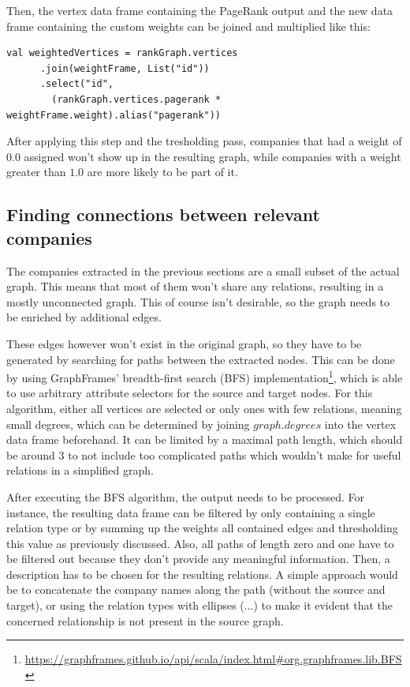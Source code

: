 \documentclass[
        a4paper,     %
        titlepage,   %
        oneside,     %
        parskip      %
        ]{scrartcl}  %
\begin{document}
  Then, the vertex data frame containing the PageRank output and the new
  data frame containing the custom weights can be joined and multiplied like this:

  \begin{lstlisting}[style=scalaStyle,caption=Custom Weight Joining]
    val weightedVertices = rankGraph.vertices
      .join(weightFrame, List("id"))
      .select("id",
        (rankGraph.vertices.pagerank * weightFrame.weight).alias("pagerank"))
  \end{lstlisting}

  After applying this step and the tresholding pass, companies that had a weight of $0.0$ assigned won't
  show up in the resulting graph, while companies with a weight greater than $1.0$
  are more likely to be part of it.

  \subsection{Finding connections between relevant companies}
  The companies extracted in the previous sections are a small subset of the actual
  graph. This means that most of them won't share any relations, resulting in a
  mostly unconnected graph. This of course isn't desirable, so the graph needs to
  be enriched by additional edges.

  These edges however won't exist in the original graph, so they have to be generated
  by searching for paths between the extracted nodes. This can be done by using
  GraphFrames' breadth-first search (BFS)
  implementation\footnote{\url{https://graphframes.github.io/api/scala/index.html\#org.graphframes.lib.BFS}},
  which is able to use arbitrary attribute selectors for the source and target nodes.
  For this algorithm, either all vertices are selected or only ones with few relations,
  meaning small degrees, which can be determined by joining $graph.degrees$ into the vertex data frame beforehand.
  It can be limited by a maximal path length, which should be around 3 to not
  include too complicated paths which wouldn't make for useful relations in a simplified graph.

  After executing the BFS algorithm, the output needs to be processed. For instance,
  the resulting data frame can be filtered by only containing a single
  relation type or by summing up the weights all contained edges and thresholding
  this value as previously discussed. Also, all paths of length zero and one have to
  be filtered out because they don't provide any meaningful information.
  Then, a description has to be chosen for the resulting relations.
  A simple approach would be to concatenate the company names along the path
  (without the source and target), or using the relation types with ellipses (...) to
  make it evident that the concerned relationship is not present in the source graph.
\end{document}
